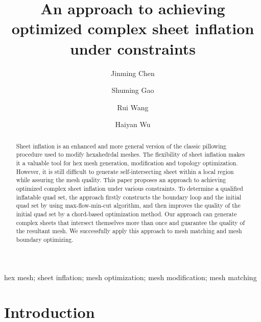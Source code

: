 \documentclass[final,5p,times,twocolumn]{elsarticle}
\begin{document}
\begin{frontmatter}

\title{An approach to achieving optimized complex sheet inflation under constraints}

\author[1]{Jinming Chen}
\author[1]{Shuming Gao}
\author[1]{Rui Wang}
\author[1]{Haiyan Wu}
\address[1]{CAD\&CG State Key Laboratory, Zhejiang University, Hangzhou, China}

\begin{abstract}
Sheet inflation is an enhanced and more general version of the classic pillowing procedure\cite{Mitchell:1995wa} used to modify hexahedrdal meshes. The flexibility of sheet inflation makes it a valuable tool for hex mesh generation, modification and topology optimization. However, it is still difficult to generate self-intersecting sheet within a local region while assuring the mesh quality. This paper proposes an approach to achieving optimized complex sheet inflation under various constraints. To determine a qualified inflatable quad set, the approach firstly constructs the boundary loop and the initial quad set by using max-flow-min-cut algorithm, and then improves the quality of the initial quad set by a chord-based optimization method. Our approach can generate complex sheets that intersect themselves more than once and guarantee the quality of the resultant mesh. We successfully apply this approach to mesh matching and mesh boundary optimizing.
\end{abstract}

\begin{keyword}
hex mesh; sheet inflation; mesh optimization; mesh modification; mesh matching

\end{keyword}

\end{frontmatter}

\linenumbers

\section{Introduction}
\label{sec:intro}
\end{document}
